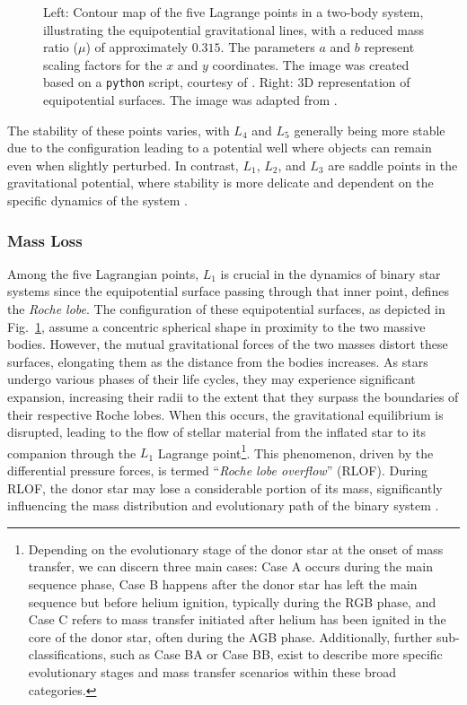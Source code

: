 \documentclass[main.tex]{subfiles}
\begin{document}
\begin{figure}[t!]
\begin{subfigure}{0.535\textwidth}
         \end{subfigure}
         \caption{Left: Contour map of the five Lagrange points in a two-body system, illustrating the equipotential gravitational lines, with a reduced mass ratio ($\mu$) of approximately $0.315$. The parameters $a$ and $b$ represent scaling factors for the $x$ and $y$ coordinates. The image was created based on a \texttt{python} script, courtesy of \cite{Zingale}.
         Right: 3D representation of equipotential surfaces. The image was adapted from \cite{Sluijs}.}
         \label{fig:eq_sur}
    \end{figure}

    The stability of these points varies, with $L_4$ and $L_5$ generally being more stable due to the configuration leading to a potential well where objects can remain even when slightly perturbed. In contrast, $L_1$, $L_2$, and $L_3$ are saddle points in the gravitational potential, where stability is more delicate and dependent on the specific dynamics of the system \citep[e.g.,][]{Szebehely, Celletti1990, Schwarz2012}. 

    \subsubsection{Mass Loss}
    Among the five Lagrangian points, $L_1$ is crucial in the dynamics of binary star systems since the equipotential surface passing through that inner point, defines the \textit{Roche lobe}. The configuration of these equipotential surfaces, as depicted in Fig.~\ref{fig:eq_sur}, assume a concentric spherical shape in proximity to the two massive bodies. However, the mutual gravitational forces of the two masses distort these surfaces, elongating them as the distance from the bodies increases. As stars undergo various phases of their life cycles, they may experience significant expansion, increasing their radii to the extent that they surpass the boundaries of their respective Roche lobes. When this occurs, the gravitational equilibrium is disrupted, leading to the flow of stellar material from the inflated star to its companion through the $L_1$ Lagrange point\footnote{Depending on the evolutionary stage of the donor star at the onset of mass transfer, we can discern three main cases: Case A occurs during the main sequence phase, Case B happens after the donor star has left the main sequence but before helium ignition, typically during the RGB phase, and Case C refers to mass transfer initiated after helium has been ignited in the core of the donor star, often during the AGB phase. Additionally, further sub-classifications, such as Case BA or Case BB, exist to describe more specific evolutionary stages and mass transfer scenarios within these broad categories.}. This phenomenon, driven by the differential pressure forces, is termed ``\textit{Roche lobe overflow}'' (RLOF). During RLOF, the donor star may lose a considerable portion of its mass, significantly influencing the mass distribution and evolutionary path of the binary system \citep[e.g.,][]{temmink:aa23}.
\end{document}
